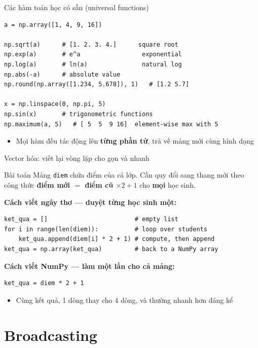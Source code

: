 \documentclass[11pt]{beamer}
\begin{document}
\begin{frame}[fragile]{Các hàm toán học có sẵn (universal functions)}
\begin{lstlisting}
a = np.array([1, 4, 9, 16])

np.sqrt(a)      # [1. 2. 3. 4.]      square root
np.exp(a)       # e^a                 exponential
np.log(a)       # ln(a)               natural log
np.abs(-a)      # absolute value
np.round(np.array([1.234, 5.678]), 1)   # [1.2 5.7]

x = np.linspace(0, np.pi, 5)
np.sin(x)       # trigonometric functions
np.maximum(a, 5)   # [ 5  5  9 16]  element-wise max with 5
\end{lstlisting}
\begin{itemize}
  \item Mọi hàm đều tác động lên \textbf{từng phần tử}, trả về mảng mới cùng hình dạng
\end{itemize}
\end{frame}

\begin{frame}[fragile]{Vector hóa: viết lại vòng lặp cho gọn và nhanh}
\begin{block}{Bài toán}
Mảng \texttt{diem} chứa điểm của cả lớp. Cần quy đổi sang thang mới theo công thức
\textbf{điểm mới $=$ điểm cũ $\times 2 + 1$} cho \textbf{mọi} học sinh.
\end{block}
\textbf{Cách viết ngây thơ --- duyệt từng học sinh một:}
\begin{lstlisting}
ket_qua = []                        # empty list
for i in range(len(diem)):          # loop over students
    ket_qua.append(diem[i] * 2 + 1) # compute, then append
ket_qua = np.array(ket_qua)         # back to a NumPy array
\end{lstlisting}
\textbf{Cách viết NumPy --- làm một lần cho cả mảng:}
\begin{lstlisting}
ket_qua = diem * 2 + 1
\end{lstlisting}
\begin{itemize}
  \item Cùng kết quả, 1 dòng thay cho 4 dòng, và thường nhanh hơn đáng kể
\end{itemize}
\end{frame}

\section{Broadcasting}
\end{document}

